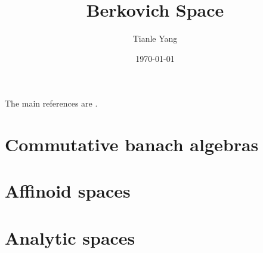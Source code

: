 \documentclass[sectionlevel=book]{noteformyself}
\title{Berkovich Space}
\author{Tianle Yang}
\date{\today}
\begin{document}
    \maketitle

    \tableofcontents %

    The main references are \cite{Ber90,BGR84}.

    \chapter{Commutative banach algebras}
       
       

    \chapter{Affinoid spaces}
       
       

    \chapter{Analytic spaces}


    \printbibliography[heading=bibintoc, title={References}] %
\end{document}
